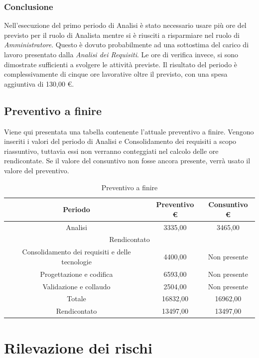 \documentclass[./PianodiProgetto.tex]{subfiles}
\begin{document}
\subsection{Conclusione}
Nell'esecuzione del primo periodo di Analisi è stato necessario usare più
ore del previsto per il ruolo di Analista mentre si è riusciti a risparmiare nel ruolo di \textit{Amministratore}. Questo è dovuto
probabilmente ad una sottostima del carico di lavoro presentato dalla \textit{Analisi
dei Requisiti}. Le ore di verifica invece, si sono dimostrate sufficienti a svolgere
le attività previste. Il risultato del periodo è complessivamente di cinque ore
lavorative oltre il previsto, con una spesa aggiuntiva di 130,00 \euro{}.
\section{Preventivo a finire}
Viene qui presentata una tabella contenente l'attuale preventivo a finire.
Vengono inseriti i valori del periodo di Analisi e Consolidamento dei requisiti
a scopo riassuntivo, tuttavia essi non verranno conteggiati nel calcolo delle
ore rendicontate. Se il valore del consuntivo non fosse ancora presente, verrà
usato il valore del preventivo.

\begin{table}[H]
	\centering
	\begin{tabular}{|c|c|c|}
		\hline
		Periodo&Preventivo \euro{}&Consuntivo \euro{} \\ \hline
		Analisi&3335,00&3465,00  \\ \hline
		\multicolumn{3}{|c|}{Rendicontato}  \\ \hline
		Consolidamento dei requisiti e delle tecnologie&4400,00&Non presente  \\ \hline
		Progettazione e codifica&6593,00&Non presente  \\ \hline
		Validazione e collaudo&2504,00&Non presente  \\ \hline
		Totale&16832,00&16962,00 \\ \hline
		Rendicontato&13497,00&13497,00 \\ \hline
	\end{tabular}
	\caption{Preventivo a finire}
\end{table}

\appendix


\appendix

\chapter{Rilevazione dei rischi}
\end{document}
